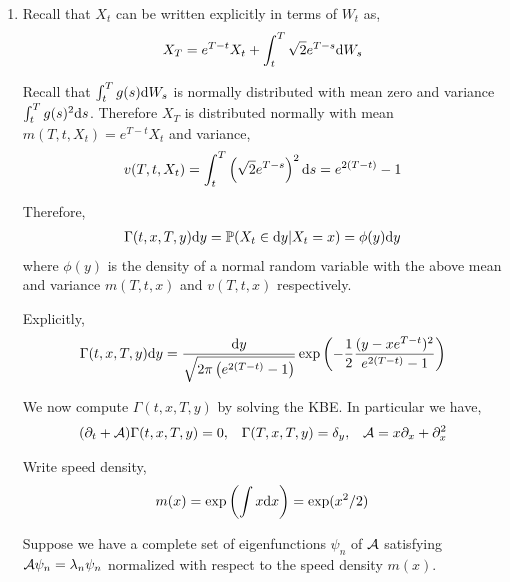 \begin{solution}[Solution]
\begin{enumerate}[label=(\alph*)]
    \item Recall that \( X_t \) can be written explicitly in terms of \( W_t \) as,
        \begin{align*}
            X_T = e^{T-t} X_t + \int_t^T \sqrt{2}e^{T-s} \d W_s %
        \end{align*}

        
        Recall that \( \int_t^T g(s)\mathrm{d} W_s \) is normally distributed with mean zero and variance \( \int_t^T g(s)^2 \mathrm{d} s \).
        Therefore \( X_T \) is distributed normally with mean \( m(T,t,X_t) = e^{T-t}X_t \) and variance,
        \begin{align*}
            v(T,t,X_t) = \int_t^T \left( \sqrt{2} e^{T-s} \right)^2\mathrm{d} s = e^{2(T-t)}-1
        \end{align*}
        

        Therefore,
        \begin{align*}
            \Gamma(t,x,T,y)\mathrm{d} y = \mathbb{P}(X_t\in\mathrm{d} y | X_t = x) = \phi(y)\mathrm{d} y
        \end{align*}
        where \( \phi(y) \) is the density of a normal random variable with the above mean and variance \( m(T,t,x) \) and \( v(T,t,x) \) respectively.
        
        Explicitly,
        \begin{align*}
            \Gamma(t,x,T,y)\mathrm{d} y = \frac{\mathrm{d} y}{ \sqrt{2\pi\left( e^{2(T-t)}-1 \right)}} \exp \left( - \frac{1}{2} \frac{ (y-xe^{T-t})^2}{ e^{2(T-t)}-1}  \right)
        \end{align*}
        
        \hrulefill

        We now compute \( \Gamma(t,x,T,y) \) by solving the KBE. In particular we have,
        \begin{align*}
            (\partial_t + \mathcal{A}) \Gamma(t,x,T,y) = 0, && \Gamma(T,x,T,y) = \delta_y, && \mathcal{A} = x\partial_x + \partial_x^2
        \end{align*}

        Write speed density,
        \begin{align*}
            m(x) = \exp \left( \int x \mathrm{d} x \right) = \exp(x^2/2)
        \end{align*}
        

        Suppose we have a complete set of eigenfunctions \( \psi_n \) of \( \mathcal{A} \) satisfying \( \mathcal{A} \psi_n = \lambda_n\psi_n \) normalized with respect to the speed density \( m(x) \).


\end{enumerate}
\end{solution}
